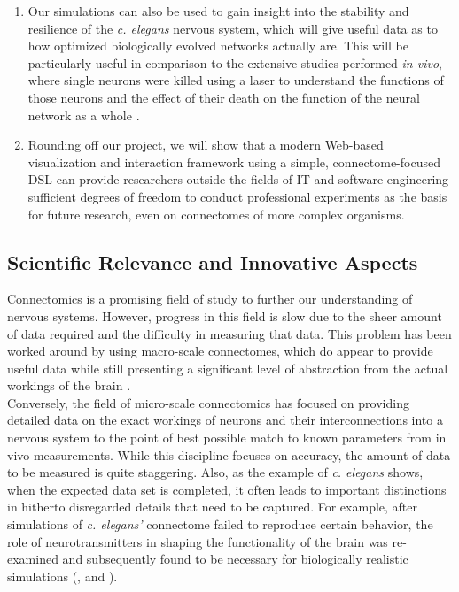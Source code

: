 \documentclass[a4paper,11pt]{article}
\begin{document}
\begin{enumerate}
\item Our simulations can also be used to gain insight into the stability and resilience of the \emph{c. elegans} nervous system, which will give useful data as to how optimized biologically evolved networks actually are. This will be particularly useful in comparison to the extensive studies performed \emph{in vivo}, where single neurons were killed using a laser to understand the functions of those neurons and the effect of their death on the function of the neural network as a whole \citep{rothman2012caenorhabditis}.
\item Rounding off our project, we will show that a modern Web-based visualization and interaction framework using a simple, connectome-focused DSL can provide researchers outside the fields of IT and software engineering sufficient degrees of freedom to conduct professional experiments as the basis for future research, even on connectomes of more complex organisms.
\end{enumerate}


\subsection{Scientific Relevance and Innovative Aspects}
Connectomics is a promising field of study to further our understanding of nervous systems. However, progress in this field is slow due to the sheer amount of data required and the difficulty in measuring that data. This problem has been worked around by using macro-scale connectomes, which do appear to provide useful data while still presenting a significant level of abstraction from the actual workings of the brain \citep{TheMissingArticle}. 
\\[0,2cm]

Conversely, the field of micro-scale connectomics has focused on providing detailed data on the exact workings of neurons and their interconnections into a nervous system to the point of best possible match to known parameters from in vivo measurements. While this discipline focuses on accuracy, the amount of data to be measured is quite staggering. Also, as the example of \emph{c. elegans} shows, when the expected data set is completed, it often leads to important distinctions in hitherto disregarded details that need to be captured. For example, after simulations of \emph{c. elegans'} connectome failed to reproduce certain behavior, the role of neurotransmitters in shaping the functionality of the brain was re-examined and subsequently found to be necessary for biologically realistic simulations (\citep{Bargmann2012}, \citep{Izquierdo2013} and \citep{Ogg1997}).\\[0,2cm]
\end{document}
